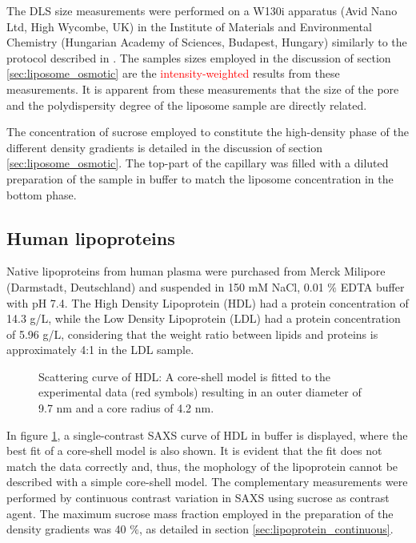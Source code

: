 The DLS size measurements were performed on a W130i apparatus (Avid Nano Ltd, High Wycombe, UK) in the Institute of Materials and Environmental Chemistry (Hungarian Academy of Sciences, Budapest, Hungary) similarly to the protocol described in \cite{varga_osmotic_2014}. The samples sizes employed in the discussion of section \ref{sec:liposome_osmotic} are the \textcolor{red}{intensity-weighted} results from these measurements. It is apparent from these measurements that the size of the pore and the polydispersity degree of the liposome sample are directly related.

The concentration of sucrose employed to constitute the high-density phase of the different density gradients is detailed in the discussion of section \ref{sec:liposome_osmotic}. The top-part of the capillary was filled with a diluted preparation of the sample in buffer to match the liposome concentration in the bottom phase.

\subsection{Human lipoproteins}

Native lipoproteins from human plasma were purchased from Merck Milipore (Darmstadt, Deutschland) and suspended in 150 mM NaCl, 0.01 $\%$ EDTA buffer with pH 7.4. The High Density Lipoprotein (HDL) had a protein concentration of 14.3 g/L, while the Low Density Lipoprotein (LDL) had a protein concentration of 5.96 g/L, considering that the weight ratio between lipids and proteins is approximately 4:1 in the LDL sample. 

\begin{figure}
	\centering
		
		\caption{Scattering curve of HDL: A core-shell model is fitted to the experimental data (red symbols) resulting in an outer diameter of 9.7 nm and a core radius of 4.2 nm.}
		\label{fig:HDLCoreShellFit}
\end{figure}

In figure \ref{fig:HDLCoreShellFit}, a single-contrast SAXS curve of HDL in buffer is displayed, where the best fit of a core-shell model is also shown. It is evident that the fit does not match the data correctly and, thus, the mophology of the lipoprotein cannot be described with a simple core-shell model. The complementary measurements were performed by continuous contrast variation in SAXS using sucrose as contrast agent. The maximum sucrose mass fraction employed in the preparation of the density gradients was 40 $\%$, as detailed in section \ref{sec:lipoprotein_continuous}.

